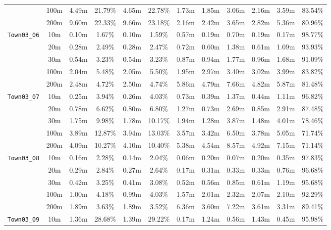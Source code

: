 \begin{table}
{\begin{tabular}{@{}cccccccccccc@{}}
      & 100m & 4.49m & 21.79\% & 4.65m & 22.78\% & 1.73m & 1.85m & 3.06m & 2.16m & 3.59m & 83.54\% \\
      & 200m & 9.60m & 22.33\% & 9.66m & 23.18\% & 2.16m & 2.42m & 3.65m & 2.82m & 5.36m & 80.96\% \\
      \midrule
      \multirow{5}{*}{\Verb|Town03_06|} & 10m & 0.10m & 1.67\% & 0.10m & 1.59\% & 0.57m & 0.19m & 0.70m & 0.19m & 0.17m & 98.77\% \\
      & 20m & 0.28m & 2.49\% & 0.28m & 2.47\% & 0.72m & 0.60m & 1.38m & 0.61m & 1.09m & 93.93\% \\
      & 30m & 0.54m & 3.23\% & 0.54m & 3.23\% & 0.87m & 0.94m & 1.77m & 0.96m & 1.68m & 91.09\% \\
      & 100m & 2.04m & 5.48\% & 2.05m & 5.50\% & 1.95m & 2.97m & 3.40m & 3.02m & 3.99m & 83.82\% \\
      & 200m & 2.48m & 4.72\% & 2.50m & 4.74\% & 5.86m & 4.79m & 7.66m & 4.82m & 5.87m & 81.48\% \\
      \midrule
      \multirow{5}{*}{\Verb|Town03_07|} & 10m & 0.25m & 3.94\% & 0.26m & 4.03\% & 0.73m & 0.39m & 1.37m & 0.44m & 1.11m & 96.82\% \\
      & 20m & 0.78m & 6.62\% & 0.80m & 6.80\% & 1.27m & 0.73m & 2.69m & 0.85m & 2.91m & 87.48\% \\
      & 30m & 1.75m & 9.98\% & 1.78m & 10.17\% & 1.94m & 1.28m & 3.87m & 1.48m & 4.01m & 78.46\% \\
      & 100m & 3.89m & 12.87\% & 3.94m & 13.03\% & 3.57m & 3.42m & 6.50m & 3.78m & 5.05m & 71.74\% \\
      & 200m & 4.09m & 10.27\% & 4.10m & 10.40\% & 5.38m & 4.54m & 8.57m & 4.92m & 7.15m & 71.14\% \\
      \midrule
      \multirow{5}{*}{\Verb|Town03_08|} & 10m & 0.16m & 2.28\% & 0.14m & 2.04\% & 0.06m & 0.20m & 0.07m & 0.20m & 0.35m & 97.83\% \\
      & 20m & 0.29m & 2.84\% & 0.27m & 2.64\% & 0.17m & 0.31m & 0.33m & 0.33m & 0.76m & 96.68\% \\
      & 30m & 0.42m & 3.25\% & 0.41m & 3.08\% & 0.52m & 0.56m & 0.85m & 0.61m & 1.19m & 95.68\% \\
      & 100m & 1.00m & 4.18\% & 0.99m & 4.03\% & 1.57m & 2.01m & 2.32m & 2.07m & 2.10m & 92.29\% \\
      & 200m & 1.89m & 3.63\% & 1.89m & 3.52\% & 6.36m & 3.60m & 7.22m & 3.61m & 3.31m & 89.41\% \\
      \midrule
      \multirow{5}{*}{\Verb|Town03_09|} & 10m & 1.36m & 28.68\% & 1.39m & 29.22\% & 0.17m & 1.24m & 0.56m & 1.43m & 0.45m & 95.98\% \\

\end{tabular}}
\end{table}
